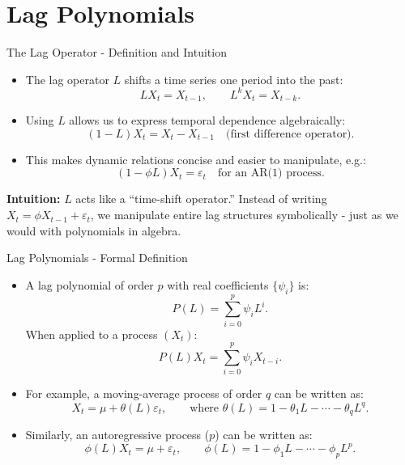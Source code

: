 \documentclass{beamer}
\begin{document}

\section{Lag Polynomials}

\begin{frame}{The Lag Operator - Definition and Intuition}
\begin{itemize}
    \item The lag operator $L$ shifts a time series one period into the past:
    \[
        L X_t = X_{t-1}, \qquad L^k X_t = X_{t-k}.
    \]
    \item Using $L$ allows us to express temporal dependence algebraically:
    \[
        (1 - L)X_t = X_t - X_{t-1} \quad \text{(first difference operator)}.
    \]
    \item This makes dynamic relations concise and easier to manipulate, e.g.:
    \[
        (1 - \phi L) X_t = \varepsilon_t \quad \text{for an AR(1) process}.
    \]
\end{itemize}
\textbf{Intuition:} $L$ acts like a “time-shift operator.”  
Instead of writing $X_t = \phi X_{t-1} + \varepsilon_t$, we manipulate entire lag structures symbolically - just as we would with polynomials in algebra.
\end{frame}


\begin{frame}{Lag Polynomials - Formal Definition}
\begin{itemize}
    \item A lag polynomial of order $p$ with real coefficients $\{\psi_i\}$ is:
    \[
        P(L) = \sum_{i=0}^{p} \psi_i L^i.
    \]
    When applied to a process $(X_t)$:
    \[
        P(L) X_t = \sum_{i=0}^{p} \psi_i X_{t-i}.
    \]
    \item For example, a moving-average process of order $q$ can be written as:
    \[
        X_t = \mu + \theta(L)\varepsilon_t, 
        \qquad \text{where } \theta(L) = 1 - \theta_1 L - \cdots - \theta_q L^q.
    \]
    \item Similarly, an autoregressive process ($p$) can be written as:
    \[
        \phi(L) X_t = \mu + \varepsilon_t, 
        \qquad \phi(L) = 1 - \phi_1 L - \cdots - \phi_p L^p.
    \]
\end{itemize}
\end{frame}
\end{document}
